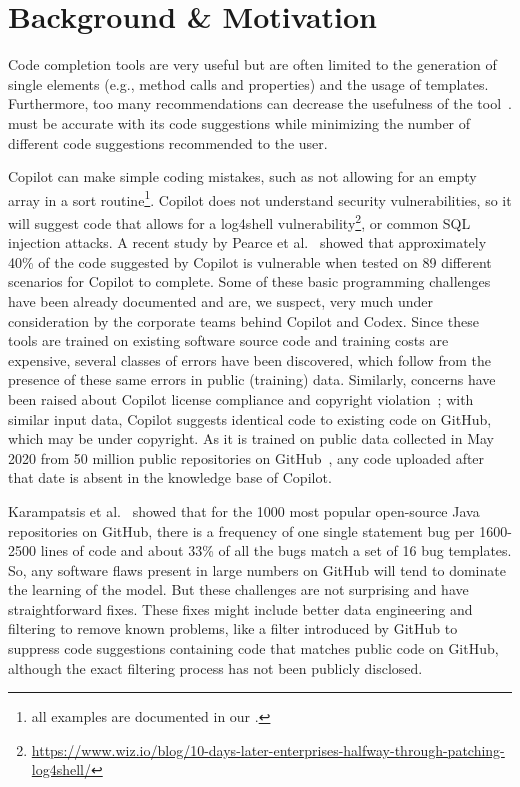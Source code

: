 \section{Background \& Motivation}
\label{challenges}
Code completion tools are very useful but are often limited to the generation of single elements (e.g., method calls and properties) and the usage of templates. 
Furthermore, too many recommendations can decrease the usefulness of the tool~\cite{Proksch2015}. 
\cct{} must be accurate with its code suggestions while minimizing the number of different code suggestions recommended to the user.

Copilot can make simple coding mistakes, such as not allowing for an empty array in a sort routine\footnote{all examples are documented in our \repl{}.}. Copilot does not understand security vulnerabilities, so it will suggest code that allows for a \textsf{log4shell} vulnerability\footnote{\url{https://www.wiz.io/blog/10-days-later-enterprises-halfway-through-patching-log4shell/}}, or common SQL injection attacks. A recent study by Pearce et al.~\cite{copilot_security} showed that approximately 40\% of the code suggested by Copilot is vulnerable when tested on 89 different scenarios for Copilot to complete.
Some of these basic programming challenges have been already documented and are, we suspect, very much under consideration by the corporate teams behind Copilot and Codex. 
Since these tools are trained on existing software source code and training costs are expensive, several classes of errors have been discovered, which follow from the presence of these same errors in public (training) data.
Similarly, concerns have been raised about Copilot license compliance and copyright violation~\cite{code_clone}; with similar input data, Copilot suggests identical code to existing code on GitHub, which may be under copyright. 
As it is trained on public data collected in May 2020 from 50 million public repositories on GitHub~\cite{copilot}, any code uploaded after that date is absent in the knowledge base of Copilot. 

Karampatsis et al.~\cite{github_bugs} showed that for the 1000 most popular open-source Java repositories on GitHub, there is a frequency of one single statement bug per 1600-2500 lines of code and about 33\% of all the bugs match a set of 16 bug templates. 
So, any software flaws present in large numbers on GitHub will tend to dominate the learning of the model.
But these challenges are not surprising and have straightforward fixes. These fixes might include better data engineering and filtering to remove known problems, like a filter introduced by GitHub to suppress code suggestions containing code that matches public code on GitHub, although the exact filtering process has not been publicly disclosed.

